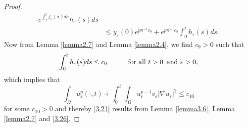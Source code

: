 \documentclass[12pt]{article}
\theoremstyle{plain}
\theoremstyle{definition}
\numberwithin{equation}{section}
\begin{document}
\begin{proof}
\begin{equation}
\begin{split}
e^{\int^t_s f_{\varepsilon}(\sigma)d\sigma} h_{\varepsilon}(s)ds\\
&\leq y_{\varepsilon}(0)e^{ p\kappa^{-1}c_8}+e^{ p\kappa^{-1}c_8}\int^t_0
 h_{\varepsilon}(s)ds.
\end{split}
\end{equation}
Now  from Lemma \ref{lemma2.7} and Lemma \ref{lemma2.4}, we find $c_9>0$ such that
$$ \int^t_0
 h_{\varepsilon}(s)ds\leq c_9 \quad\quad\quad \hbox{for all}\,\, t>0 \,\hbox{ and}\,\, \varepsilon>0,
$$
which implies that
\begin{equation}\label{3.26}
    \int_\Omega u_\varepsilon^p(\cdot,t)+\int_0^{t}\int_\Omega u_\varepsilon^{p-1}v_\varepsilon|\nabla u_\varepsilon|^2\leq c_{10}
\end{equation}
for some $c_{10}>0$ and thereby
\eqref{3.21} results from Lemma \ref{lemma3.6}, Lemma \ref{lemma2.7} and \eqref{3.26}.
\end{proof}
\end{document}
